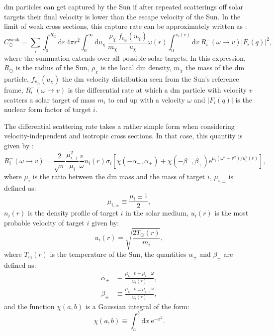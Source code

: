\gls{dm} particles can get captured by the Sun if after repeated scatterings off solar targets their final velocity is lower than the escape velocity of the Sun. In the limit of weak cross sections, this capture rate can be approximately written as \cite{Gould1987}:
\begin{equation}\label{2.5}
	C_{\odot}^{\mathrm{weak}} = \sum_{i} \int_{0}^{R_{\odot}} \mathrm{d}r \ 4\pi r^{2} \int_{0}^{\infty} \mathrm{d}u_{\chi} \ \frac{\rho_{\chi}}{m_{\chi}} \frac{f_{v_{\odot}}(u_{\chi})}{u_{\chi}} \omega(r) \int_{0}^{v_{e}(r)} \mathrm{d}v \ R_{i}^{-}(\omega \rightarrow v) |F_{i}(q)|^{2},
\end{equation}
where the summation extends over all possible solar targets. In this expression, $R_{\odot}$ is the radius of the Sun, $\rho_{\chi}$ is the local \gls{dm} density, $m_{\chi}$ the mass of the \gls{dm} particle, $f_{v_{\odot}}(u_{\chi})$ the \gls{dm} velocity distribution seen from the Sun's reference frame, $R_{i}^{-}(\omega \rightarrow v)$ is the differential rate at which a \gls{dm} particle with velocity $v$ scatters a solar target of mass $m_{i}$ to end up with a velocity $\omega$ and $|F_{i}(q)|$ is the nuclear form factor of target $i$.

The differential scattering rate takes a rather simple form when considering velocity-independent and isotropic cross sections. In that case, this quantity is given by \cite{Gould1987, Palomares2017}:
\begin{equation}\label{2.6}
	R_{i}^{-}(\omega \rightarrow v) = \frac{2}{\sqrt{\pi}} \frac{\mu_{i,+}^{2}}{\mu_{i}} \frac{v}{\omega} n_{i}(r) \sigma_{i} \left[\chi(- \alpha_{-}, \alpha_{+})+\chi(- \beta_{-}, \beta_{+}) \mathrm{e}^{\mu_{i}(\omega^{2}-v^{2})/u_{i}^{2}(r)}\right],
\end{equation}
where $\mu_{i}$ is the ratio between the \gls{dm} mass and the mass of target $i$, $\mu_{i,\pm}$ is defined as:
\begin{equation}\label{2.7}
	\mu_{i,\pm} \equiv \frac{\mu_{i} \pm 1}{2},
\end{equation}
$n_{i}(r)$ is the density profile of target $i$ in the solar medium, $u_{i}(r)$ is the most probable velocity of target $i$ given by:
\begin{equation}\label{2.8}
	u_{i}(r) = \sqrt{\frac{2 T_{\odot}(r)}{m_{i}}},
\end{equation}
where $T_{\odot}(r)$ is the temperature of the Sun, the quantities $\alpha_{\pm}$ and $\beta_{\pm}$ are defined as:
\begin{align}\label{2.9-2.10}
	\alpha_{\pm} &\equiv \frac{\mu_{i,+} v \pm \mu_{i,-} \omega}{u_{i}(r)},\\
	\beta_{\pm} &\equiv \frac{\mu_{i,-} v \pm \mu_{i,+} \omega}{u_{i}(r)},
\end{align}
and the function $\chi(a,b)$ is a Gaussian integral of the form:
\begin{equation}\label{2.11}
	\chi(a,b) \equiv \int_{a}^{b} \mathrm{d}x \ \mathrm{e}^{-x^{2}}. 
\end{equation}

